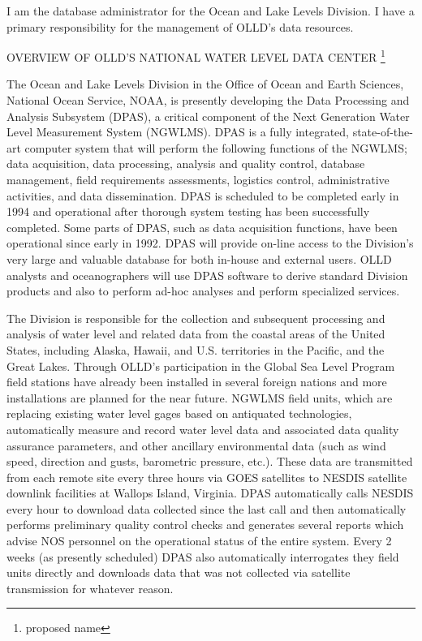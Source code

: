 \medskip
\large
{}
\normalsize
\medskip

	I am the database administrator for the Ocean and Lake Levels 
Division.  I have a primary responsibility for the management of OLLD's 
data resources.

\medskip
OVERVIEW OF OLLD'S NATIONAL WATER LEVEL DATA CENTER \footnote {proposed 
name}

\medskip
	The Ocean and Lake Levels Division in the Office of Ocean and Earth 
Sciences, National Ocean Service, NOAA, is presently developing the Data 
Processing and Analysis Subsystem (DPAS), a critical component of the 
Next Generation Water Level Measurement System (NGWLMS).  DPAS is a 
fully integrated, state-of-the-art computer system that will perform the 
following functions of the NGWLMS; data acquisition, data processing, 
analysis and quality control, database management, field requirements 
assessments, logistics control, administrative activities, and data 
dissemination.  DPAS is scheduled to be completed early in 1994 and 
operational after thorough system testing has been successfully 
completed.  Some parts of DPAS, such as data acquisition functions, have 
been operational since early in 1992.  DPAS will provide on-line access to 
the Division's very large and valuable database for both in-house and 
external users.  OLLD analysts and oceanographers will use DPAS software 
to derive standard Division products and also to perform ad-hoc analyses 
and perform specialized services.

	The Division is responsible for the collection and subsequent 
processing and analysis of water level and related data from the coastal 
areas of the United States, including Alaska, Hawaii, and U.S. territories 
in the Pacific, and the Great Lakes.  Through OLLD's participation in the 
Global Sea Level Program field stations have already been installed in 
several foreign nations and more installations are planned for the near 
future.  NGWLMS field units, which are replacing existing water level 
gages based on antiquated technologies, automatically measure and record 
water level data and associated data quality assurance parameters, and 
other ancillary environmental data (such as wind speed, direction and 
gusts, barometric pressure, etc.).  These data are transmitted from each 
remote site every three hours via GOES satellites to NESDIS satellite 
downlink facilities at Wallops Island, Virginia.  DPAS automatically calls 
NESDIS every hour to download data collected since the last call and then 
automatically performs preliminary quality control checks and generates 
several reports which advise NOS personnel on the operational status of 
the entire system.  Every 2 weeks (as presently scheduled) DPAS also 
automatically interrogates they field units directly and downloads data 
that was not collected via satellite transmission for whatever reason.

